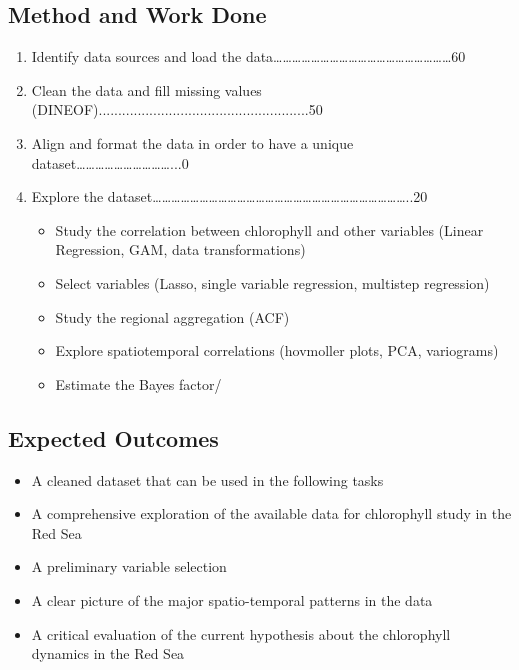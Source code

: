 \subsection{Method and Work Done}

\begin{enumerate}
\item Identify data sources and load the data…………………………………………………60%
\item Clean the data and fill missing values (DINEOF)......................................................50%
\item Align and format the data in order to have a unique dataset…………………………...0%
\item Explore the dataset………………………………………………………………………..20%
\begin{itemize}
\item Study the correlation between chlorophyll and other variables (Linear Regression, GAM, data transformations)
\item Select variables (Lasso, single variable regression, multistep regression)
\item Study the regional aggregation (ACF)
\item Explore spatiotemporal correlations (hovmoller plots, PCA, variograms)
\item Estimate the Bayes factor/ %
\end{itemize}
\end{enumerate}

\subsection{Expected Outcomes}

\begin{itemize}
\item A cleaned dataset that can be used in the following tasks
\item A comprehensive exploration of the available data for chlorophyll study in the Red Sea
\item A preliminary variable selection
\item A clear picture of the major spatio-temporal patterns in the data
\item A critical evaluation of the current hypothesis about the chlorophyll dynamics in the Red Sea
\end{itemize}


